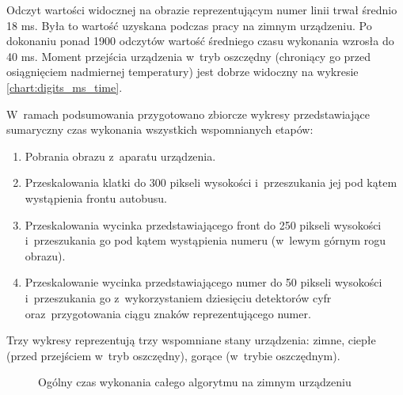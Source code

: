 Odczyt wartości widocznej na obrazie reprezentującym numer linii
trwał średnio 18 ms. Była to wartość uzyskana podczas pracy
na zimnym urządzeniu. Po dokonaniu ponad 1900 odczytów
wartość średniego czasu wykonania wzrosła do 40 ms.
Moment przejścia urządzenia w~tryb oszczędny (chroniący go przed
osiągnięciem nadmiernej temperatury) jest dobrze widoczny na wykresie
\ref{chart:digits_ms_time}.

W~ramach podsumowania przygotowano zbiorcze wykresy 
przedstawiające sumaryczny czas wykonania wszystkich wspomnianych
etapów:
\begin{enumerate}
    \item Pobrania obrazu z~aparatu urządzenia.
    \item Przeskalowania klatki do 300 pikseli wysokości i~przeszukania 
    jej pod kątem wystąpienia frontu autobusu.
    \item Przeskalowania wycinka przedstawiającego front do 250 pikseli wysokości
    i~przeszukania go pod kątem wystąpienia numeru (w~lewym górnym rogu obrazu).
    \item Przeskalowanie wycinka przedstawiającego numer do 50 pikseli wysokości
    i~przeszukania go z~wykorzystaniem dziesięciu detektorów cyfr oraz~przygotowania
    ciągu znaków reprezentującego numer.
\end{enumerate}

Trzy wykresy reprezentują trzy wspomniane stany urządzenia: zimne,
ciepłe (przed przejściem w~tryb oszczędny), gorące (w~trybie oszczędnym).

\begin{figure}[h!]
	\begin{center}
	\end{center}
	\caption{Ogólny czas wykonania całego algorytmu na zimnym urządzeniu}
	\label{chart:whole_alg_ms_time_cold}
\end{figure}

